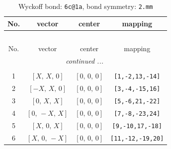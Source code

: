\documentclass[fleqn,8pt]{jsarticle}
\begin{document}
\renewcommand{\arraystretch}{1.2}
\begin{longtable}{cccc}
\caption{Wyckoff bond: {\tt 6c@1a}, bond symmetry: {\tt 2.mm}}
 \\
 \hline \hline
No. & vector & center & mapping \\ \hline \endfirsthead

\multicolumn{3}{l}{\tablename\ \thetable{}} \\
 \hline \hline
No. & vector & center & mapping \\ \hline \endhead

 \hline \hline
\multicolumn{3}{r}{\footnotesize\it continued ...} \\ \endfoot

 \hline \hline
\multicolumn{3}{r}{} \\ \endlastfoot

1 & $\left[ X,\, X,\, 0 \right]$ & $\left[ 0,\, 0,\, 0 \right]$ & {\tt [1,-2,13,-14]} \\ \hline
2 & $\left[ - X,\, X,\, 0 \right]$ & $\left[ 0,\, 0,\, 0 \right]$ & {\tt [3,-4,-15,16]} \\ \hline
3 & $\left[ 0,\, X,\, X \right]$ & $\left[ 0,\, 0,\, 0 \right]$ & {\tt [5,-6,21,-22]} \\ \hline
4 & $\left[ 0,\, - X,\, X \right]$ & $\left[ 0,\, 0,\, 0 \right]$ & {\tt [7,-8,-23,24]} \\ \hline
5 & $\left[ X,\, 0,\, X \right]$ & $\left[ 0,\, 0,\, 0 \right]$ & {\tt [9,-10,17,-18]} \\ \hline
6 & $\left[ X,\, 0,\, - X \right]$ & $\left[ 0,\, 0,\, 0 \right]$ & {\tt [11,-12,-19,20]} \\
\end{longtable}
\renewcommand{\arraystretch}{1.2}
\end{document}
